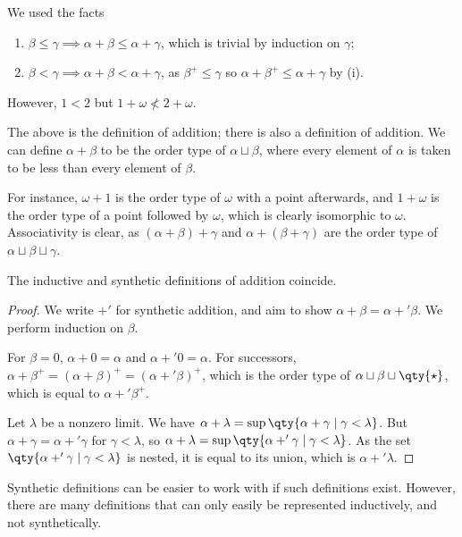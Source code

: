 \begin{remark}
    We used the facts
    \begin{enumerate}
        \item $\beta \leq \gamma \implies \alpha + \beta \leq \alpha + \gamma$, which is trivial by induction on $\gamma$;
        \item $\beta < \gamma \implies \alpha + \beta < \alpha + \gamma$, as $\beta^+ \leq \gamma$ so $\alpha + \beta^+ \leq \alpha + \gamma$ by (i).
    \end{enumerate}
    However, $1 < 2$ but $1 + \omega \not < 2 + \omega$.
\end{remark}
The above is the  definition of addition; there is also a  definition of addition.
We can define $\alpha + \beta$ to be the order type of $\alpha \sqcup \beta$, where every element of $\alpha$ is taken to be less than every element of $\beta$.

For instance, $\omega + 1$ is the order type of $\omega$ with a point afterwards, and $1 + \omega$ is the order type of a point followed by $\omega$, which is clearly isomorphic to $\omega$.
Associativity is clear, as $(\alpha + \beta) + \gamma$ and $\alpha + (\beta + \gamma)$ are the order type of $\alpha \sqcup \beta \sqcup \gamma$.
\begin{proposition}
    The inductive and synthetic definitions of addition coincide.
\end{proposition}
\begin{proof}
    We write $+'$ for synthetic addition, and aim to show $\alpha + \beta = \alpha +' \beta$.
    We perform induction on $\beta$.

    For $\beta = 0$, $\alpha + 0 = \alpha$ and $\alpha +' 0 = \alpha$.
    For successors, $\alpha + \beta^+ = (\alpha + \beta)^+ = (\alpha +' \beta)^+$, which is the order type of $\alpha \sqcup \beta \sqcup \qty{\star}$, which is equal to $\alpha +' \beta^+$.

    Let $\lambda$ be a nonzero limit.
    We have $\alpha + \lambda = \sup\qty{\alpha + \gamma \mid \gamma < \lambda}$.
    But $\alpha + \gamma = \alpha +' \gamma$ for $\gamma < \lambda$, so $\alpha + \lambda = \sup\qty{\alpha +' \gamma \mid \gamma < \lambda}$.
    As the set $\qty{\alpha +' \gamma \mid \gamma < \lambda}$ is nested, it is equal to its union, which is $\alpha +' \lambda$.
\end{proof}
Synthetic definitions can be easier to work with if such definitions exist.
However, there are many definitions that can only easily be represented inductively, and not synthetically.

